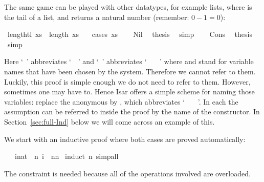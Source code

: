 \begin{isabellebody}
\begin{isamarkuptext}
The same game can be played with other datatypes, for example lists,
where  is the tail of a list, and  returns a
natural number (remember: $0-1=0$):%
\end{isamarkuptext}%
\isamarkuptrue%
\isamarkupfalse%
\ {\isachardoublequote}length{\isacharparenleft}tl\ xs{\isacharparenright}\ {\isacharequal}\ length\ xs\ {\isacharminus}\ {}{\isachardoublequote}\isanewline
\isamarkupfalse%
\ {\isacharparenleft}cases\ xs{\isacharparenright}\isanewline
\ \ \isamarkupfalse%
\ Nil\ \isamarkupfalse%
\ {\isacharquery}thesis\ \isamarkupfalse%
\ simp\isanewline
\isamarkupfalse%
\isanewline
\ \ \isamarkupfalse%
\ Cons\ \isamarkupfalse%
\ {\isacharquery}thesis\ \isamarkupfalse%
\ simp\isanewline
\isamarkupfalse%
\isamarkupfalse%
%
\begin{isamarkuptext}%
\noindent Here `~' abbreviates
`~~' and
`~'
abbreviates `~\isa{{\isacharquery}\ {\isacharquery}{\isacharquery}}
~~'
where \isa{{\isacharquery}} and \isa{{\isacharquery}{\isacharquery}}
stand for variable names that have been chosen by the system.
Therefore we cannot refer to them.
Luckily, this proof is simple enough we do not need to refer to them.
However, sometimes one may have to. Hence Isar offers a simple scheme for
naming those variables: replace the anonymous  by
, which abbreviates `~
~~'.
In each  the assumption can be
referred to inside the proof by the name of the constructor. In
Section~\ref{sec:full-Ind} below we will come across an example
of this.%
\end{isamarkuptext}%
\isamarkuptrue%
%
\isamarkuptrue%
%
\begin{isamarkuptext}%
We start with an inductive proof where both cases are proved automatically:%
\end{isamarkuptext}%
\isamarkuptrue%
\ {\isachardoublequote}{}\ {\isacharasterisk}\ {\isacharparenleft}{\isasymSum}i{\isacharcolon}{\isacharcolon}nat\ {\isacharless}\ n{\isacharplus}{}{\isachardot}\ i{\isacharparenright}\ {\isacharequal}\ n{\isacharasterisk}{\isacharparenleft}n{\isacharplus}{}{\isacharparenright}{\isachardoublequote}\isanewline
\isamarkupfalse%
\ {\isacharparenleft}induct\ n{\isacharcomma}\ simp{\isacharunderscore}all{\isacharparenright}\isamarkupfalse%
%
\begin{isamarkuptext}%
\noindent The constraint  is needed because all of
the operations involved are overloaded.


\end{isamarkuptext}
\end{isabellebody}
